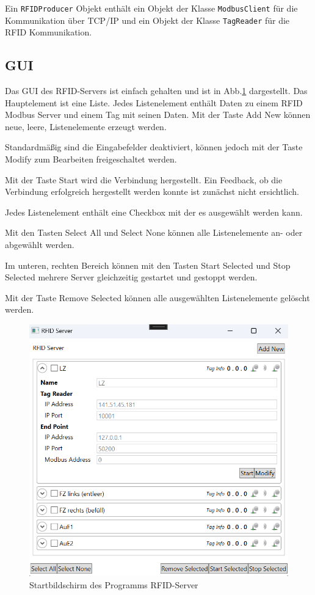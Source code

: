 Ein \verb|RFIDProducer| Objekt enthält ein Objekt der Klasse \verb|ModbusClient| für die Kommunikation über TCP/IP und
ein Objekt der Klasse \verb|TagReader| für die RFID Kommunikation.


\subsection{GUI}
Das GUI des RFID-Servers ist einfach gehalten und ist in Abb.\ref{fig:figure7} dargestellt.
Das Hauptelement ist eine Liste.
Jedes Listenelement enthält Daten zu einem RFID Modbus Server und einem Tag mit seinen Daten.
Mit der Taste \glqq Add New\grqq{} können neue, leere, Listenelemente erzeugt werden.

Standardmäßig sind die Eingabefelder deaktiviert, können jedoch mit der Taste \glqq Modify\grqq{} zum Bearbeiten
freigeschaltet werden.

Mit der Taste \glqq Start\grqq{} wird die Verbindung hergestellt. Ein Feedback, ob die Verbindung erfolgreich hergestellt
werden konnte ist zunächst nicht ersichtlich.

Jedes Listenelement enthält eine Checkbox mit der es ausgewählt werden kann.

Mit den Tasten \glqq Select All\grqq{} und \glqq Select None\grqq{} können alle Listenelemente an- oder abgewählt werden.

Im unteren, rechten Bereich können mit den Tasten \glqq Start Selected\grqq{} und \glqq Stop Selected\grqq{} mehrere Server
gleichzeitig gestartet und gestoppt werden.

Mit der Taste \glqq Remove Selected\grqq{} können alle ausgewählten Listenelemente gelöscht werden.

\begin{figure}
    \caption[Startbildschirm des Programms RFID-Server]
    {\small Startbildschirm des Programms RFID-Server}\label{fig:figure7}
    \includegraphics[height = \textwidth ]{Bilder/RFIDServer_Bildschirm}
    \centering
\end{figure}



